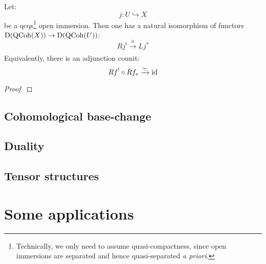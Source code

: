             \begin{theorem} \label{theorem: extending_qcoh_from_qc_open_subschemes}
                Let:
                    $$j: U \hookrightarrow X$$
                be a qcqs\footnote{Technically, we only need to assume quasi-compactness, since open immersions are separated and hence quasi-separated \textit{a priori}.} open immersion. Then one has a natural isomorphism of functors $\mathrm{D}(\mathrm{QCoh}(X)) \to \mathrm{D}(\mathrm{QCoh}(U))$:
                    $$Rj^! \xrightarrow[]{\cong} Lj^*$$
                Equivalently, there is an adjunction counit:
                    $$Rf^! \circ Rf_* \xrightarrow[]{\simeq} \mathrm{id}$$
            \end{theorem}
                \begin{proof}
                    
                \end{proof}

        \subsection{Cohomological base-change}

        \subsection{Duality}

        \subsection{Tensor structures}

    \section{Some applications}
